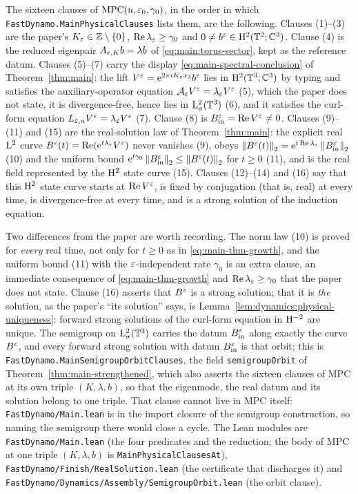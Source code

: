 The sixteen clauses of $\mathrm{MPC}(u,\varepsilon_0,\gamma_0)$, in the order in
which \texttt{FastDynamo.MainPhysicalClauses} lists them, are the following.
Clauses (1)--(3) are the paper's
$K_\varepsilon\in\mathbb{Z}\setminus\{0\}$, $\operatorname{Re}\lambda_\varepsilon\geq\gamma_0$ and
$0\neq b^\varepsilon\in\mathrm{H}^2(\mathbb{T}^2;\mathbb{C}^3)$.  Clause (4) is the reduced eigenpair
$A_{\varepsilon,K}b=\lambda b$ of \eqref{eq:main:torus-sector}, kept as the reference
datum.  Clauses (5)--(7) carry the display
\eqref{eq:main-spectral-conclusion} of Theorem~\ref{thm:main}: the lift
$V^\varepsilon=\mathrm{e}^{2\pi iK_\varepsilon x_3}b^\varepsilon$ lies in $\mathrm{H}^2(\mathbb{T}^3;\mathbb{C}^3)$ by typing and
satisfies the auxiliary-operator equation $\mathcal{A}_\varepsilon V^\varepsilon=\lambda_\varepsilon V^\varepsilon$
(5), which the paper does not state, it is
divergence-free, hence lies in $\mathrm{L}^2_\sigma(\mathbb{T}^3)$ (6), and it satisfies the
curl-form equation $L_{\varepsilon,u}V^\varepsilon=\lambda_\varepsilon V^\varepsilon$ (7).  Clause (8) is
$B_{\rm in}^\varepsilon=\operatorname{Re} V^\varepsilon\neq0$.  Clauses (9)--(11) and (15) are the
real-solution law of Theorem~\ref{thm:main}: the explicit real $\mathrm{L}^2$ curve
$B^\varepsilon(t)=\operatorname{Re}(\mathrm{e}^{t\lambda_\varepsilon}V^\varepsilon)$ never vanishes (9), obeys
$\left\|B^\varepsilon(t)\right\|_2=\mathrm{e}^{t\operatorname{Re}\lambda_\varepsilon}\left\|B_{\rm in}^\varepsilon\right\|_2$ (10) and the
uniform bound $\mathrm{e}^{t\gamma_0}\left\|B_{\rm in}^\varepsilon\right\|_2\leq\left\|B^\varepsilon(t)\right\|_2$
for $t\geq0$ (11), and is the real field represented by the $\mathrm{H}^2$ state
curve (15).  Clauses (12)--(14) and (16) say that this $\mathrm{H}^2$ state curve
starts at $\operatorname{Re} V^\varepsilon$, is fixed by conjugation (that is, real) at every time,
is divergence-free at every time, and is a strong solution of the induction
equation.

Two differences from the paper are worth recording.  The norm law (10) is
proved for \emph{every} real time, not only for $t\geq0$ as in
\eqref{eq:main-thm-growth}, and the uniform bound (11) with the
$\varepsilon$-independent rate $\gamma_0$ is an extra clause, an immediate consequence of
\eqref{eq:main-thm-growth} and $\operatorname{Re}\lambda_\varepsilon\geq\gamma_0$ that the paper does not
state.  Clause (16) asserts that $B^\varepsilon$ is a strong solution; that it is \emph{the}
solution, as the paper's ``its solution'' says, is
Lemma~\ref{lem:dynamics:physical-uniqueness}: forward strong solutions of the curl-form
equation in $\mathrm{H}^{-2}$ are unique.  The semigroup on $\mathrm{L}^2_\sigma(\mathbb{T}^3)$ carries the datum
$B_{\rm in}^\varepsilon$ along exactly the curve $B^\varepsilon$, and every forward strong solution with
datum $B_{\rm in}^\varepsilon$ is that orbit; this is \texttt{FastDynamo.MainSemigroupOrbitClauses},
the field \texttt{semigroupOrbit} of Theorem~\ref{thm:main-strengthened}, which also asserts
the sixteen clauses of $\mathrm{MPC}$ at its own triple $(K,\lambda,b)$, so that the eigenmode,
the real datum and its solution belong to one triple.  That clause cannot
live in $\mathrm{MPC}$ itself: \texttt{FastDynamo/Main.lean} is in the import closure of the
semigroup construction, so naming the semigroup there would close a cycle.  The Lean modules
are \texttt{FastDynamo/Main.lean} (the four predicates and the reduction; the body of
$\mathrm{MPC}$ at one triple $(K,\lambda,b)$ is \texttt{MainPhysicalClausesAt}),
\texttt{FastDynamo/Finish/RealSolution.lean} (the certificate that discharges it) and
\texttt{FastDynamo/Dynamics/Assembly/SemigroupOrbit.lean} (the orbit clause).

